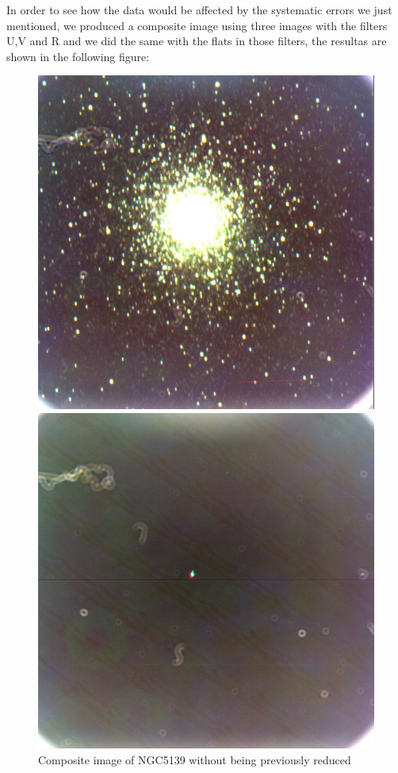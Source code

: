 In order to see how the data would be affected by the systematic errors we just mentioned, we produced a composite image using three images with the filters U,V and R and we did the same with the flats in those filters, the resultas are shown in the following figure:
  
\begin{figure}[h]
  \centering
  \begin{minipage}[b]{0.45\textwidth}
    \includegraphics[width=\textwidth]{images/ngc_5139_dirty.png}
    \caption{Composite image of NGC5139 without being previously reduced}
  \end{minipage}
  \hfill
  \begin{minipage}[b]{0.45\textwidth}
    \includegraphics[width=\textwidth]{images/ruido.png}

\end{minipage}
\end{figure}
